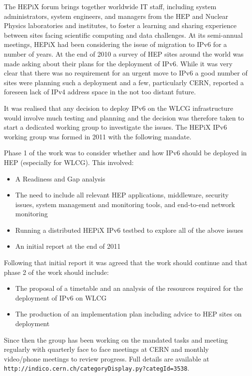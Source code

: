 The HEPiX forum brings together worldwide IT staff, including system administrators, system engineers, and managers from the HEP and Nuclear Physics laboratories and institutes, to foster a learning and sharing experience between sites facing scientific computing and data challenges. At its semi-annual meetings, HEPiX had been considering the issue of migration to IPv6 for a number of years. At the end of 2010 a survey of HEP sites around the world was made asking about their plans for the deployment of IPv6. While it was very clear that there was no requirement for an urgent move to IPv6 a good number of sites were planning such a deployment and a few, particularly CERN, reported a foreseen lack of IPv4 address space in the not too distant future.

It was realised that any decision to deploy IPv6 on the WLCG infrastructure would involve much testing and planning and the decision was therefore taken to start a dedicated working group to investigate the issues. The HEPiX IPv6 working group was formed in 2011 with the following mandate.

Phase 1 of the work was to consider whether and how IPv6 should be deployed in HEP (especially for WLCG). This involved:
\begin {itemize}
\item A Readiness and Gap analysis
\item The need to include all relevant HEP applications, middleware, security issues, system management and monitoring tools, and end-to-end network monitoring
\item Running a distributed HEPiX IPv6 testbed to explore all of the above issues
\item An initial report at the end of 2011
\end {itemize}	
Following that initial report it was agreed that the work should continue and that phase 2 of the work should include:
\begin {itemize}
\item The proposal of a timetable and an analysis of the resources required for the deployment of IPv6 on WLCG
\item The production of an implementation plan including advice to HEP sites on deployment
\end {itemize}

Since then the group has been working on the mandated tasks and meeting regularly with quarterly face to face meetings at CERN and monthly video/phone meetings to review progress. Full details are available at {\tt http://indico.cern.ch/categoryDisplay.py?categId=3538}.


